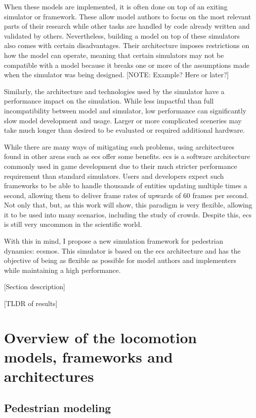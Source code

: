 \documentclass[twoside, 11pt]{article}
\begin{document}
When these models are implemented, it is often done on top of an exiting simulator or framework. These allow model authors to focus on the most relevant parts of their research while other tasks are handled by code already written and validated by others. Nevertheless, building a model on top of these simulators also comes with certain disadvantages. Their architecture imposes restrictions on how the model can operate, meaning that certain simulators may not be compatible with a model because it breaks one or more of the assumptions made when the simulator was being designed. [NOTE: Example? Here or later?]

Similarly, the architecture and technologies used by the simulator have a performance impact on the simulation. While less impactful than full incompatibility between model and simulator, low performance can significantly slow model development and usage. Larger or more complicated sceneries may take much longer than desired to be evaluated or required additional hardware.

While there are many ways of mitigating such problems, using architectures found in other areas such as \gls{ecs} offer some benefits. \gls{ecs} is a software architecture commonly used in game development due to their much stricter performance requirement than standard simulators. Users and developers expect such frameworks to be able to handle thousands of entities updating multiple times a second, allowing them to deliver frame rates of upwards of 60 frames per second. Not only that, but, as this work will show, this paradigm is very flexible, allowing it to be used into many scenarios, including the study of crowds. Despite this, \gls{ecs} is still very uncommon in the scientific world.

With this in mind, I propose a new simulation framework for pedestrian dynamics: \gls{ecsmos}. This simulator is based on the \gls{ecs} architecture and has the objective of being as flexible as possible for model authors and implementers while maintaining a high performance.

[Section description]

[TLDR of results]

\section{Overview of the locomotion models, frameworks and architectures} \label{overview}

\subsection{Pedestrian modeling}
\end{document}
